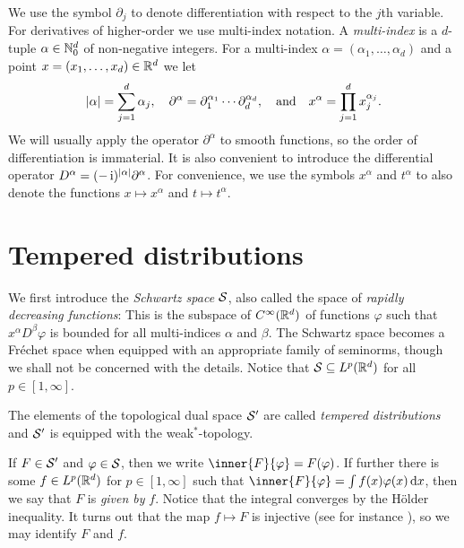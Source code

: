 \documentclass[article, a4paper, 11pt, oneside]{memoir}
\let\phi\varphi
\numberwithin{equation}{chapter}
\theoremstyle{myexample}
\theoremstyle{myexample}
\theoremstyle{myexamplebreak}
\theoremstyle{myexamplebreak}
\theoremstyle{nonumberplain}
\theoremstyle{MyNonumberplain}
\begin{document}
We use the symbol $\partial_j$ to denote differentiation with respect to the $j$th variable. For derivatives of higher-order we use multi-index notation. A \emph{multi-index} is a $d$-tuple $\alpha \in \mathbb{N}_0^d$ of non-negative integers. For a multi-index $\alpha = (\alpha_1, \ldots, \alpha_d)$ and a point $x = (x_1, \ldots, x_d) \in \mathbb{R}^d$ we let
%
\begin{equation*}
    \lvert\alpha\rvert = \sum_{j=1}^d \alpha_j,
    \quad
    \partial^\alpha = \partial_1^{\alpha_1} \cdots \partial_d^{\alpha_d},
    \quad \text{and} \quad
    x^\alpha = \prod_{j=1}^d x_j^{\alpha_j}.
\end{equation*}
%
We will usually apply the operator $\partial^\alpha$ to smooth functions, so the order of differentiation is immaterial. It is also convenient to introduce the differential operator $D^\alpha = (-\operatorname{i})^{\lvert\alpha\rvert} \partial^\alpha$. For convenience, we use the symbols $x^\alpha$ and $t^\alpha$ to also denote the functions $x \mapsto x^\alpha$ and $t \mapsto t^\alpha$.


\section{Tempered distributions}

We first introduce the \emph{Schwartz space} $\mathcal{S}$, also called the space of \emph{rapidly decreasing functions}: This is the subspace of $C^\infty(\mathbb{R}^d)$ of functions $\phi$ such that $x^\alpha D^\beta \phi$ is bounded for all multi-indices $\alpha$ and $\beta$. The Schwartz space becomes a Fréchet space when equipped with an appropriate family of seminorms, though we shall not be concerned with the details. Notice that $\mathcal{S} \subseteq L^p(\mathbb{R}^d)$ for all $p \in [1, \infty]$.

The elements of the topological dual space $\mathcal{S}'$ are called \emph{tempered distributions} and $\mathcal{S}'$ is equipped with the weak${}^*$-topology.

If $F \in \mathcal{S}'$ and $\phi \in \schwartz$, then we write $\inner{F}{\phi} = F(\phi)$. If further there is some $f \in L^p(\mathbb{R}^d)$ for $p \in [1, \infty]$ such that $\inner{F}{\phi} = \int f(x) \phi(x) \dif x$, then we say that $F$ is \emph{given by} $f$. Notice that the integral converges by the Hölder inequality. It turns out that the map $f \mapsto F$ is injective (see for instance \textcite[Lemma~3.2]{grubb2009}), so we may identify $F$ and $f$.
\end{document}
